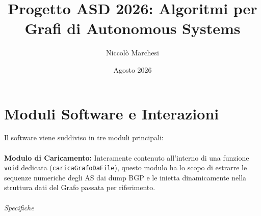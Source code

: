 \documentclass[12pt, a4paper]{article}
\title{Progetto ASD 2026: Algoritmi per Grafi di Autonomous Systems}
\author{Niccolò Marchesi}
\date{Agosto 2026}
\begin{document}
\maketitle

\section*{Moduli Software e Interazioni}
Il software viene suddiviso in tre moduli principali:\\ \\
{\large\textbf{Modulo di Caricamento:}} Interamente contenuto all'interno di una funzione \texttt{void} dedicata (\texttt{caricaGrafoDaFile}), questo modulo ha lo scopo di estrarre le sequenze numeriche degli AS dai dump BGP e le inietta dinamicamente nella struttura dati del Grafo passata per riferimento. \\ \\
{\large \textit{Specifiche}}
\end{document}
